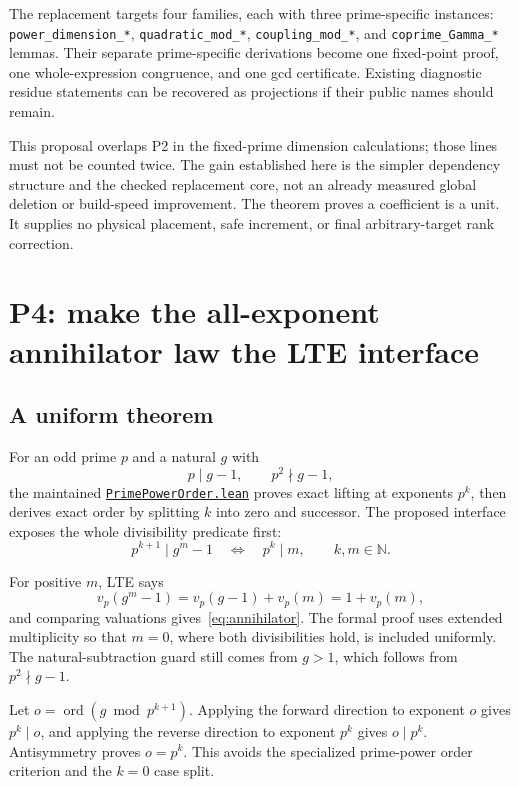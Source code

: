\documentclass[11pt,letterpaper]{article}
\newcommand{\N}{\mathbb N}
\newcommand{\repobase}{https://github.com/VladimirReshetnikov/ProveIt/blob/9f35798db4a63c25e435fca14d75931144657d7e}
\newcommand{\leanfile}[1]{\href{\repobase/Computability/DiophantineConsistency/Lean/DiophantineConsistency/#1.lean}{\nolinkurl{#1.lean}}}
\newcommand{\ident}[1]{\nolinkurl{#1}}
\begin{document}
The replacement targets four families, each with three prime-specific instances:
\ident{power_dimension_*}, \ident{quadratic_mod_*},
\ident{coupling_mod_*}, and \ident{coprime_Gamma_*} lemmas. Their separate
prime-specific derivations become one fixed-point proof, one whole-expression
congruence, and one gcd certificate. Existing diagnostic residue statements
can be recovered as projections if their public names should remain.

This proposal overlaps P2 in the fixed-prime dimension calculations; those
lines must not be counted twice. The gain established here is the simpler
dependency structure and the checked replacement core, not an already
measured global deletion or build-speed improvement. The theorem proves a
coefficient is a unit. It supplies no physical placement, safe increment,
or final arbitrary-target rank correction.

\section{P4: make the all-exponent annihilator law the LTE interface}

\subsection{A uniform theorem}

For an odd prime $p$ and a natural $g$ with
\[
 p\mid g-1,\qquad p^2\nmid g-1,
\]
the maintained \leanfile{PrimePowerOrder} proves exact lifting at exponents
$p^k$, then derives exact order by splitting $k$ into zero and successor.
The proposed interface exposes the whole divisibility predicate first:
\begin{equation}
 p^{k+1}\mid g^m-1\quad\Longleftrightarrow\quad p^k\mid m,
 \qquad k,m\in\N.
 \label{eq:annihilator}
\end{equation}

For positive $m$, LTE says
\[
 v_p(g^m-1)=v_p(g-1)+v_p(m)=1+v_p(m),
\]
and comparing valuations gives~\eqref{eq:annihilator}. The formal proof
uses extended multiplicity so that $m=0$, where both divisibilities hold,
is included uniformly. The natural-subtraction guard still comes from
$g>1$, which follows from $p^2\nmid g-1$.

Let $o=\operatorname{ord}(g\bmod p^{k+1})$. Applying the forward direction
to exponent $o$ gives $p^k\mid o$, and applying the reverse direction to
exponent $p^k$ gives $o\mid p^k$. Antisymmetry proves
$o=p^k$. This avoids the specialized prime-power order criterion and the
$k=0$ case split.
\end{document}

